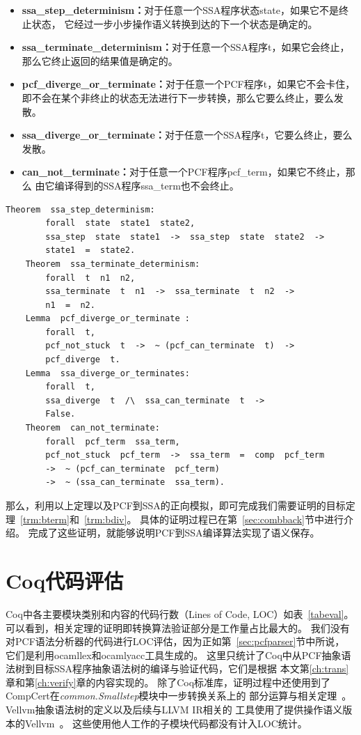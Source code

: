 \begin{itemize}
    \item \textbf{ssa\_step\_determinism：}对于任意一个SSA程序状态state，如果它不是终止状态，
        它经过一步小步操作语义转换到达的下一个状态是确定的。
    \item \textbf{ssa\_terminate\_determinism：}对于任意一个SSA程序t，如果它会终止，
        那么它终止返回的结果值是确定的。
    \item \textbf{pcf\_diverge\_or\_terminate：}对于任意一个PCF程序t，如果它不会卡住，
        即不会在某个非终止的状态无法进行下一步转换，那么它要么终止，要么发散。
    \item \textbf{ssa\_diverge\_or\_terminate：}对于任意一个SSA程序t，它要么终止，要么发散。
    \item \textbf{can\_not\_terminate：}对于任意一个PCF程序pcf\_term，如果它不终止，那么
        由它编译得到的SSA程序ssa\_term也不会终止。
\end{itemize}

\begin{lstlisting}[language=Coq, caption=Coq中后向模拟证明所需的定理, label=code:back]  
    Theorem  ssa_step_determinism:
        forall  state  state1  state2,
        ssa_step  state  state1  ->  ssa_step  state  state2  ->
        state1  =  state2.
    Theorem  ssa_terminate_determinism:
        forall  t  n1  n2,
        ssa_terminate  t  n1  ->  ssa_terminate  t  n2  ->
        n1  =  n2.
    Lemma  pcf_diverge_or_terminate :
        forall  t,
        pcf_not_stuck  t  ->  ~ (pcf_can_terminate  t)  -> 
        pcf_diverge  t.
    Lemma  ssa_diverge_or_terminates:
        forall  t,
        ssa_diverge  t  /\  ssa_can_terminate  t  ->
        False.
    Theorem  can_not_terminate:
        forall  pcf_term  ssa_term,
        pcf_not_stuck  pcf_term  ->  ssa_term  =  comp  pcf_term 
        ->  ~ (pcf_can_terminate  pcf_term)  
        ->  ~ (ssa_can_terminate  ssa_term).
\end{lstlisting}

那么，利用以上定理以及PCF到SSA的正向模拟，即可完成我们需要证明的目标定理~\ref{trm:bterm}和~\ref{trm:bdiv}。
具体的证明过程已在第~\ref{sec:combback}节中进行介绍。
完成了这些证明，就能够说明PCF到SSA编译算法实现了语义保存。

\section{Coq代码评估}

Coq中各主要模块类别和内容的代码行数（Lines of Code, LOC）如表~\ref{tabeval}。
可以看到，相关定理的证明即转换算法验证部分是工作量占比最大的。
我们没有对PCF语法分析器的代码进行LOC评估，因为正如第~\ref{sec:pcfparser}节中所说，
它们是利用ocamllex和ocamlyacc工具生成的。
这里只统计了Coq中从PCF抽象语法树到目标SSA程序抽象语法树的编译与验证代码，它们是根据
本文第\ref{ch:trans}章和第\ref{ch:verify}章的内容实现的。
除了Coq标准库，证明过程中还使用到了CompCert在\textit{common.Smallstep}模块中一步转换关系上的
部分运算与相关定理~\cite{leroy2009formally}。Vellvm抽象语法树的定义以及后续与LLVM IR相关的
工具使用了提供操作语义版本的Vellvm~\cite{vellvm2012}。
这些使用他人工作的子模块代码都没有计入LOC统计。

